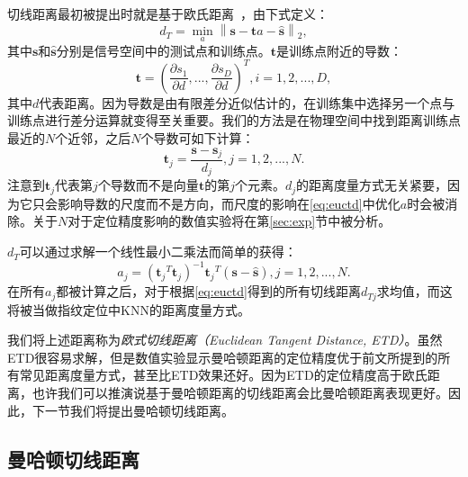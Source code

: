 切线距离最初被提出时就是基于欧氏距离~\cite{simard1998transformation}，由下式定义：
\begin{equation}
d_T = \mathop {\min }\limits_{a} {{\left\| \mathbf{s} - \mathbf{t}a - \widehat{\mathbf{s}} \right\|}_2}, \label{eq:euctd}
\end{equation}
其中$\mathbf{s}$和$\widehat{\mathbf{s}}$分别是信号空间中的测试点和训练点。$\mathbf{t}$是训练点附近的导数：
\begin{equation}
\mathbf{t} = {\left( \frac{\partial s_1}{\partial d}, ..., \frac{\partial s_D}{\partial d} \right)}^T, i = 1, 2, ..., D,
\end{equation}
其中$d$代表距离。因为导数是由有限差分近似估计的，在训练集中选择另一个点与训练点进行差分运算就变得至关重要。我们的方法是在物理空间中找到距离训练点最近的$N$个近邻，之后$N$个导数可如下计算：
\begin{equation}
\mathbf{t}_j = \frac{\mathbf{s} - \mathbf{s}_j}{d_j}, j = 1, 2, ..., N.
\end{equation}
注意到$\mathbf{t}_j$代表第$j$个导数而不是向量$\mathbf{t}$的第$j$个元素。$d_j$的距离度量方式无关紧要，因为它只会影响导数的尺度而不是方向，而尺度的影响在\eqref{eq:euctd}中优化$a$时会被消除。关于$N$对于定位精度影响的数值实验将在第\ref{sec:exp}节中被分析。

$d_T$可以通过求解一个线性最小二乘法而简单的获得：
\begin{equation}
a_j = {\left( {\mathbf{t}_j}^T\mathbf{t}_j \right)}^{-1}{\mathbf{t}_j}^T\left( {\mathbf{s}} - \widehat{\mathbf{s}} \right), j = 1, 2, ..., N. \label{eq:euca}
\end{equation}
在所有$a_j$都被计算之后，对于根据\eqref{eq:euctd}得到的所有切线距离$d_{Tj}$求均值，而这将被当做指纹定位中KNN的距离度量方式。

我们将上述距离称为\textit{欧式切线距离（Euclidean Tangent Distance, ETD）}。虽然ETD很容易求解，但是数值实验显示曼哈顿距离的定位精度优于前文所提到的所有常见距离度量方式，甚至比ETD效果还好。因为ETD的定位精度高于欧氏距离，也许我们可以推演说基于曼哈顿距离的切线距离会比曼哈顿距离表现更好。因此，下一节我们将提出曼哈顿切线距离。

\subsection{曼哈顿切线距离}

